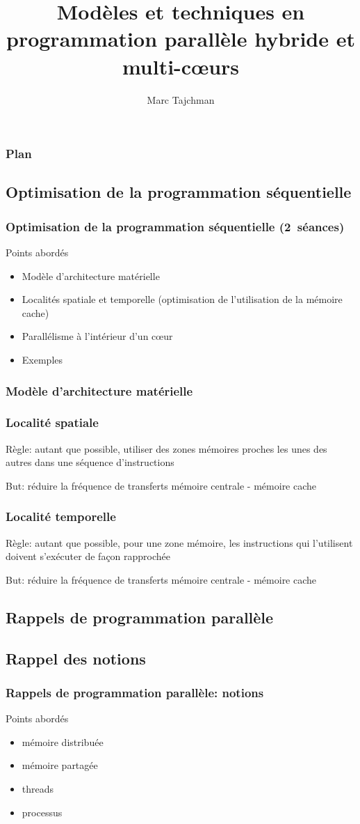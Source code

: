 \documentclass{beamer}
\title{Modèles et techniques en programmation parallèle hybride et multi-c\oe urs}
\author{Marc Tajchman}\institute{CEA - DEN/DM2S/STMF/LMES}
\begin{document}
\begin{frame}
\titlepage
\end{frame}

\Large
\begin{frame}
  	\frametitle{Plan}
  	\tableofcontents
\end{frame}

\begin{frame}
\section{Optimisation de la programmation séquentielle}
\frametitle{Optimisation de la programmation séquentielle \hbox{(2 séances)}}
Points abordés
\begin{itemize}
\item Modèle d'architecture matérielle
\item Localités spatiale et temporelle (optimisation de l'utilisation de la mémoire cache)
\item Parallélisme à l'intérieur d'un c\oe ur
\item Exemples
\end{itemize}
\end{frame}

\begin{frame}
\frametitle{Modèle d'architecture matérielle}
\end{frame}

\begin{frame}
\frametitle{Localité spatiale}
Règle: autant que possible, utiliser des zones mémoires proches les unes des autres dans une séquence d'instructions

\bigskip
But: réduire la fréquence de transferts mémoire centrale - mémoire cache
\end{frame}

\begin{frame}
\frametitle{Localité temporelle}
Règle: autant que possible, pour une zone mémoire, les instructions qui l'utilisent doivent s'exécuter de façon rapprochée

\bigskip
But: réduire la fréquence de transferts mémoire centrale - mémoire cache
\end{frame}

\begin{frame}
\section{Rappels de programmation parallèle}
\subsection{Rappel des notions}
\frametitle{Rappels de programmation parallèle: notions}
Points abordés
\begin{itemize}
\item mémoire distribuée
\item mémoire partagée
\item threads
\item processus
\end{itemize}
\end{frame}
\end{document}
